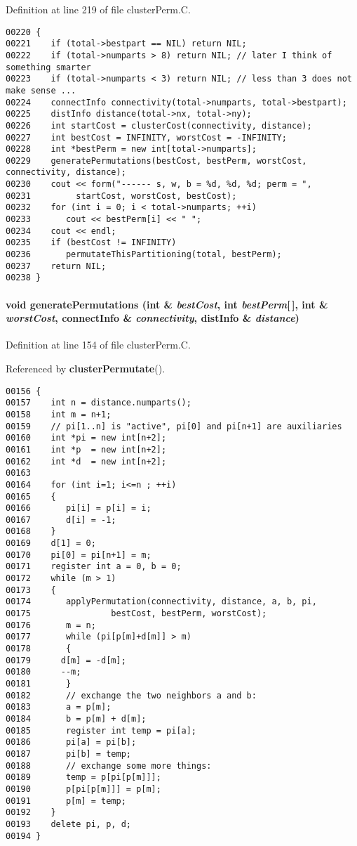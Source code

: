 Definition at line 219 of file cluster\-Perm.C.\small\begin{verbatim}00220 {
00221    if (total->bestpart == NIL) return NIL;
00222    if (total->numparts > 8) return NIL; // later I think of something smarter
00223    if (total->numparts < 3) return NIL; // less than 3 does not make sense ...
00224    connectInfo connectivity(total->numparts, total->bestpart);
00225    distInfo distance(total->nx, total->ny);
00226    int startCost = clusterCost(connectivity, distance);
00227    int bestCost = INFINITY, worstCost = -INFINITY;
00228    int *bestPerm = new int[total->numparts];
00229    generatePermutations(bestCost, bestPerm, worstCost, connectivity, distance);
00230    cout << form("------ s, w, b = %d, %d, %d; perm = ",
00231         startCost, worstCost, bestCost);
00232    for (int i = 0; i < total->numparts; ++i)
00233       cout << bestPerm[i] << " ";
00234    cout << endl;
00235    if (bestCost != INFINITY)
00236       permutateThisPartitioning(total, bestPerm);
00237    return NIL;
00238 }
\end{verbatim}\normalsize 
\label{clusterPerm.C_a4}
\paragraph{\setlength{\rightskip}{0pt plus 5cm}void generate\-Permutations (int \& {\em best\-Cost}, int {\em best\-Perm}[$\,$], int \& {\em worst\-Cost}, {\bf connect\-Info} \& {\em connectivity}, {\bf dist\-Info} \& {\em distance})}\hfill



Definition at line 154 of file cluster\-Perm.C.

Referenced by {\bf cluster\-Permutate}().\small\begin{verbatim}00156 {
00157    int n = distance.numparts();
00158    int m = n+1;
00159    // pi[1..n] is "active", pi[0] and pi[n+1] are auxiliaries
00160    int *pi = new int[n+2];
00161    int *p  = new int[n+2];
00162    int *d  = new int[n+2];
00163 
00164    for (int i=1; i<=n ; ++i)
00165    {
00166       pi[i] = p[i] = i;
00167       d[i] = -1;
00168    }
00169    d[1] = 0;
00170    pi[0] = pi[n+1] = m;
00171    register int a = 0, b = 0;
00172    while (m > 1)
00173    {
00174       applyPermutation(connectivity, distance, a, b, pi,
00175                bestCost, bestPerm, worstCost);
00176       m = n;
00177       while (pi[p[m]+d[m]] > m)
00178       {
00179      d[m] = -d[m];
00180      --m;
00181       }
00182       // exchange the two neighbors a and b:
00183       a = p[m];
00184       b = p[m] + d[m];
00185       register int temp = pi[a];
00186       pi[a] = pi[b];
00187       pi[b] = temp;
00188       // exchange some more things:
00189       temp = p[pi[p[m]]];
00190       p[pi[p[m]]] = p[m];
00191       p[m] = temp;
00192    }
00193    delete pi, p, d;
00194 }
\end{verbatim}\normalsize 
\label{clusterPerm.C_a5}
